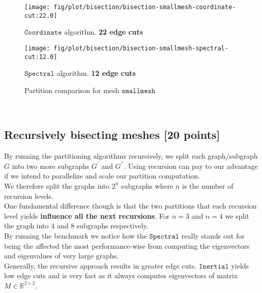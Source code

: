 \documentclass[unicode,11pt,a4paper,oneside,numbers=endperiod,openany]{scrartcl}
\begin{document}
\begin{figure}[h!]
    \begin{minipage}{0.5\textwidth}
        \centering
        \texttt{[image: fig/plot/bisection/bisection-smallmesh-coordinate-cut:22.0]}
        \caption{$\texttt {Coordinate}$ algorithm. \textbf{22 edge cuts}}
    \end{minipage}
        \begin{minipage}{0.5\textwidth}
        \centering
        \texttt{[image: fig/plot/bisection/bisection-smallmesh-spectral-cut:12.0]}
        \caption{$\texttt {Spectral}$ algorithm. \textbf{12 edge cuts}}
    \end{minipage}
    \caption*{Partition comparison for mesh $\texttt {smallmesh}$}
\end{figure}\\

\clearpage
\subsection{Recursively bisecting meshes [20 points]}
By running the partitioning algorithms recursively, we split each graph/subgraph $G$ into two more subgraphs $G^'$ and $G^{''}$. Using recursion can pay to our advantage if we intend to parallelize and scale our partition computation. \\
We therefore split the graphs into $2^n$ subgraphs where $n$ is the number of recursion levels.\\
One fundamental difference though is that the two partitions that each recursion level yields \textbf{influence all the next recursions}. For $n=3$ and $n=4$ we split the graph into $4$ and $8$ subgraphs respectively.\\
By running the benchmark we notice how the $\texttt {Spectral}$ really stands out for being the affected the most performance-wise from computing the eigenvectors and eigenvalues of very large graphs.\\ Generally, the recursive approach results in greater edge cuts. $\texttt {Inertial}$ yields low edge cuts and is very fast as it always computes eigenvectors of matrix $M\in \mathbb{R}^{2\times 2}$. 
\end{document}
